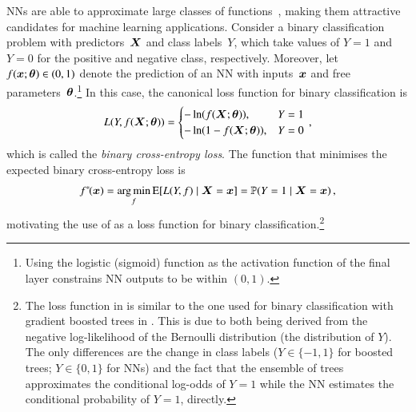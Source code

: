 NNs are able to approximate large classes of
functions~\cite{cybenko1989approximation,hornik1989multilayer}, making them
attractive candidates for machine learning applications.
Consider a binary classification problem with predictors~$\bm{X}$ and class
labels~$Y$, which take values of $Y = 1$ and $Y = 0$ for the positive and
negative class, respectively. Moreover,
let~$f(\bm{x}; \bm{\theta}) \in (0, 1)$ denote the prediction of an NN
with inputs~$\bm{x}$ and free parameters~$\bm{\theta}$.\footnote{Using the
  logistic (sigmoid) function as the activation function of the final layer
  constrains NN outputs to be within $(0, 1)$.} In this case, the canonical loss
function for binary classification is
\begin{align}
  L(Y, f(\bm{X}; \bm{\theta})) =
  \begin{cases}
    -\ln\mathopen{}\left( f(\bm{X}; \bm{\theta}) \right)\mathclose{},       & Y = 1 \\
    -\ln\mathopen{}\left( 1 - f(\bm{X}; \bm{\theta}) \right)\mathclose{},   & Y = 0 \\
  \end{cases} \,\text{,}
  \label{eq:loss_bce}
\end{align}
which is called the \emph{binary cross-entropy loss}. The function that
minimises the expected binary cross-entropy loss is
\begin{align*}
  f^{*\!}(\bm{x})
  = \operatorname*{arg\,min}_{f} \operatorname{E}[ L(Y, f) \mid \bm{X} = \bm{x} ]
  = \mathbb{P}(Y = 1 \mid \bm{X} = \bm{x}) \,\text{,}
\end{align*}
motivating the use of  as a loss function for binary
classification.\footnote{The loss function in  is similar to
  the one used for binary classification with gradient boosted trees in
  . This is due to both being derived from the negative
  log-likelihood of the Bernoulli distribution (the distribution of $Y$). The
  only differences are the change in class labels ($Y \in \{-1, 1\}$ for boosted
  trees; $Y \in \{0, 1\}$ for NNs) and the fact that the ensemble of trees
  approximates the conditional log-odds of $Y = 1$ while the NN estimates the
  conditional probability of $Y = 1$, directly.}

